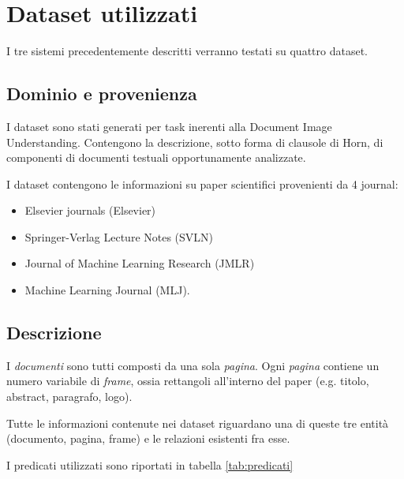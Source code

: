 \section{Dataset utilizzati}

I tre sistemi precedentemente descritti verranno testati su quattro dataset.

\subsection{Dominio e provenienza}
I dataset sono stati generati per task inerenti alla Document Image Understanding.
Contengono la descrizione, sotto forma di clausole di Horn, di componenti di documenti testuali opportunamente analizzate.

I dataset contengono le informazioni su paper scientifici provenienti da 4 journal:
\begin{itemize}
\item Elsevier journals (Elsevier)
\item Springer-Verlag Lecture Notes (SVLN)
\item Journal of Machine Learning Research (JMLR)
\item Machine Learning Journal (MLJ).
\end{itemize}

\subsection{Descrizione}
I \emph{documenti} sono tutti composti da una sola \emph{pagina}. Ogni \emph{pagina} contiene un numero variabile di \emph{frame}, ossia rettangoli all'interno del paper (e.g. titolo, abstract, paragrafo, logo).

Tutte le informazioni contenute nei dataset riguardano una di queste tre entità (documento, pagina, frame) e le relazioni esistenti fra esse.

I predicati utilizzati sono riportati in tabella \ref{tab:predicati}

